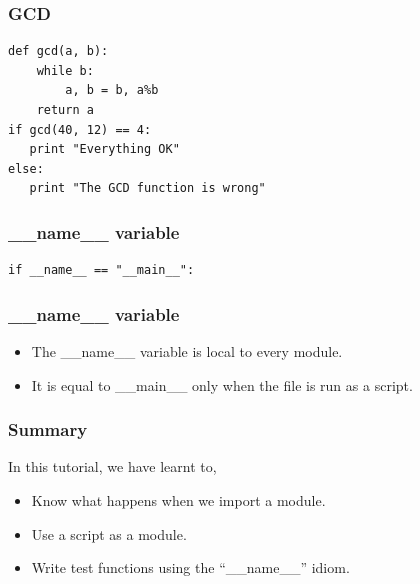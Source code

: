 \documentclass[17pt]{beamer}
\begin{document}
\begin{frame}[fragile]
\frametitle{GCD}
\label{sec-4}

\lstset{language=Python}

\begin{footnotesize}
\begin{lstlisting}
def gcd(a, b):
    while b:
        a, b = b, a%b
    return a
if gcd(40, 12) == 4:
   print "Everything OK"
else:
   print "The GCD function is wrong"
\end{lstlisting}
\end{footnotesize}

\end{frame}

\begin{frame}[fragile]
\frametitle{\_\_name\_\_ variable}
\label{sec-5}

\lstset{language=Python}
\begin{lstlisting}
if __name__ == "__main__":
\end{lstlisting}
\end{frame}

\begin{frame}[fragile]
\frametitle{\_\_name\_\_ variable}
\begin{itemize}
\item The \_\_name\_\_ variable is local to every module.
\item It is equal to \_\_main\_\_ only when the file is run as a script.
\end{itemize}
\end{frame}

\begin{frame}
\frametitle{Summary}
\label{sec-6}

In this tutorial, we have learnt to,

\begin{itemize}
\item Know what happens when we import a module.\pause
\item Use a script as a module.\pause
\item Write test functions using the ``\_\_name\_\_'' idiom.
\end{itemize}
\end{frame}
\end{document}
